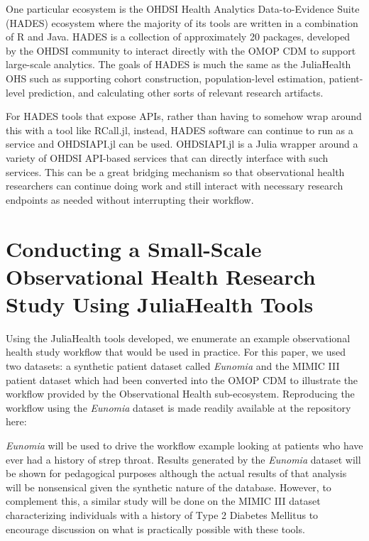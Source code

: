 \documentclass{juliacon}
\begin{document}
One particular ecosystem is the OHDSI Health Analytics Data-to-Evidence Suite (HADES) ecosystem where the majority of its tools are written in a combination of R and Java.
HADES is a collection of approximately 20 packages, developed by the OHDSI community to interact directly with the OMOP CDM to support large-scale analytics.
The goals of HADES is much the same as the JuliaHealth OHS such as supporting cohort construction, population-level estimation, patient-level prediction, and calculating other sorts of relevant research artifacts.

For HADES tools that expose APIs, rather than having to somehow wrap around this with a tool like RCall.jl, instead, HADES software can continue to run as a service and OHDSIAPI.jl can be used.
OHDSIAPI.jl is a Julia wrapper around a variety of OHDSI API-based services that can directly interface with such services.
This can be a great bridging mechanism so that observational health researchers can continue doing work and still interact with necessary research endpoints as needed without interrupting their workflow.


\section{Conducting a Small-Scale Observational Health Research Study Using JuliaHealth Tools}

Using the JuliaHealth tools developed, we enumerate an example observational health study workflow that would be used in practice.\footnotemark
For this paper, we used two datasets: a synthetic patient dataset called \textit{Eunomia} and the MIMIC III patient dataset which had been converted into the OMOP CDM to illustrate the workflow provided by the Observational Health sub-ecosystem.
Reproducing the workflow using the \textit{Eunomia} dataset is made readily available at the repository here: \cite{schuemieEunomia2023}


\textit{Eunomia} will be used to drive the workflow example looking at patients who have ever had a history of strep throat.
Results generated by the \textit{Eunomia} dataset will be shown for pedagogical purposes although the actual results of that analysis will be nonsensical given the synthetic nature of the database.
However, to complement this, a similar study will be done on the MIMIC III dataset characterizing individuals with a history of Type 2 Diabetes Mellitus to encourage discussion on what is practically possible with these tools.
\end{document}
